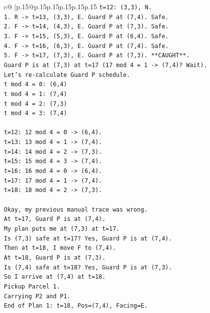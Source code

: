 \documentclass{article}
\begin{document}
{\begin{supertabular}{c@{$\;$}|p{.15\linewidth}@{}p{.15\linewidth}p{.15\linewidth}p{.15\linewidth}p{.15\linewidth}p{.15\linewidth}}
{{{\texttt{t=12: (3,3), N.} \\
\texttt{1. R {-}> t=13, (3,3), E. Guard P at (7,4). Safe.} \\
\texttt{2. F {-}> t=14, (4,3), E. Guard P at (7,3). Safe.} \\
\texttt{3. F {-}> t=15, (5,3), E. Guard P at (6,4). Safe.} \\
\texttt{4. F {-}> t=16, (6,3), E. Guard P at (7,4). Safe.} \\
\texttt{5. F {-}> t=17, (7,3), E. Guard P at (7,3). **CAUGHT**.} \\
\texttt{Guard P is at (7,3) at t=17 (17 mod 4 = 1 {-}> (7,4)? Wait).} \\
\texttt{Let's re{-}calculate Guard P schedule.} \\
\texttt{t mod 4 = 0: (6,4)} \\
\texttt{t mod 4 = 1: (7,4)} \\
\texttt{t mod 4 = 2: (7,3)} \\
\texttt{t mod 4 = 3: (7,4)} \\
\\ 
\texttt{t=12: 12 mod 4 = 0 {-}> (6,4).} \\
\texttt{t=13: 13 mod 4 = 1 {-}> (7,4).} \\
\texttt{t=14: 14 mod 4 = 2 {-}> (7,3).} \\
\texttt{t=15: 15 mod 4 = 3 {-}> (7,4).} \\
\texttt{t=16: 16 mod 4 = 0 {-}> (6,4).} \\
\texttt{t=17: 17 mod 4 = 1 {-}> (7,4).} \\
\texttt{t=18: 18 mod 4 = 2 {-}> (7,3).} \\
\\ 
\texttt{Okay, my previous manual trace was wrong.} \\
\texttt{At t=17, Guard P is at (7,4).} \\
\texttt{My plan puts me at (7,3) at t=17.} \\
\texttt{Is (7,3) safe at t=17? Yes, Guard P is at (7,4).} \\
\texttt{Then at t=18, I move F to (7,4).} \\
\texttt{At t=18, Guard P is at (7,3).} \\
\texttt{Is (7,4) safe at t=18? Yes, Guard P is at (7,3).} \\
\texttt{So I arrive at (7,4) at t=18.} \\
\texttt{Pickup Parcel 1.} \\
\texttt{Carrying P2 and P1.} \\
\texttt{End of Plan 1: t=18, Pos=(7,4), Facing=E.} \\
}}}
\end{supertabular}}
\end{document}

